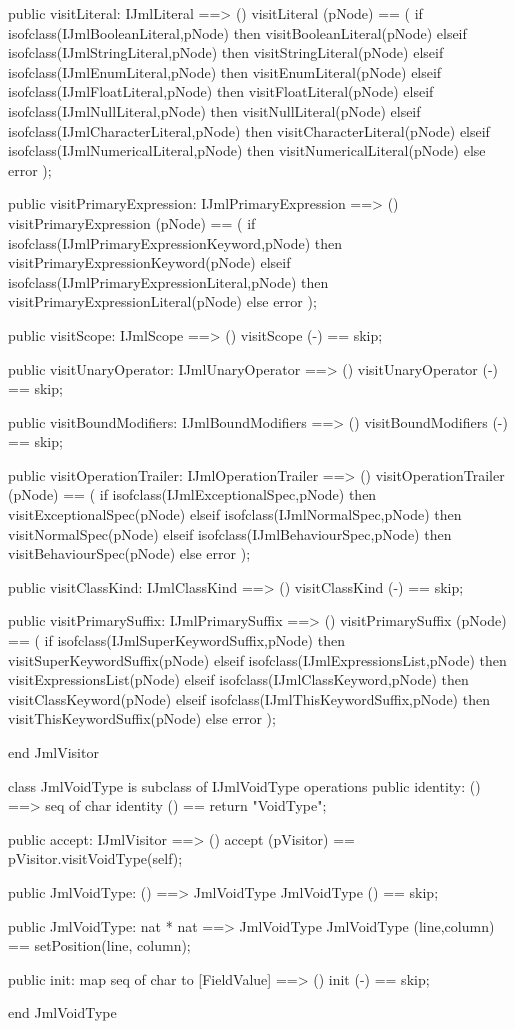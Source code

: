 \begin{vdm_al}
  public visitLiteral: IJmlLiteral ==> ()
  visitLiteral (pNode) ==
    ( if isofclass(IJmlBooleanLiteral,pNode) then visitBooleanLiteral(pNode)
      elseif isofclass(IJmlStringLiteral,pNode) then visitStringLiteral(pNode)
      elseif isofclass(IJmlEnumLiteral,pNode) then visitEnumLiteral(pNode)
      elseif isofclass(IJmlFloatLiteral,pNode) then visitFloatLiteral(pNode)
      elseif isofclass(IJmlNullLiteral,pNode) then visitNullLiteral(pNode)
      elseif isofclass(IJmlCharacterLiteral,pNode) then visitCharacterLiteral(pNode)
      elseif isofclass(IJmlNumericalLiteral,pNode) then visitNumericalLiteral(pNode)
      else error );

  public visitPrimaryExpression: IJmlPrimaryExpression ==> ()
  visitPrimaryExpression (pNode) ==
    ( if isofclass(IJmlPrimaryExpressionKeyword,pNode) then visitPrimaryExpressionKeyword(pNode)
      elseif isofclass(IJmlPrimaryExpressionLiteral,pNode) then visitPrimaryExpressionLiteral(pNode)
      else error );

  public visitScope: IJmlScope ==> ()
  visitScope (-) == skip;

  public visitUnaryOperator: IJmlUnaryOperator ==> ()
  visitUnaryOperator (-) == skip;

  public visitBoundModifiers: IJmlBoundModifiers ==> ()
  visitBoundModifiers (-) == skip;

  public visitOperationTrailer: IJmlOperationTrailer ==> ()
  visitOperationTrailer (pNode) ==
    ( if isofclass(IJmlExceptionalSpec,pNode) then visitExceptionalSpec(pNode)
      elseif isofclass(IJmlNormalSpec,pNode) then visitNormalSpec(pNode)
      elseif isofclass(IJmlBehaviourSpec,pNode) then visitBehaviourSpec(pNode)
      else error );

  public visitClassKind: IJmlClassKind ==> ()
  visitClassKind (-) == skip;

  public visitPrimarySuffix: IJmlPrimarySuffix ==> ()
  visitPrimarySuffix (pNode) ==
    ( if isofclass(IJmlSuperKeywordSuffix,pNode) then visitSuperKeywordSuffix(pNode)
      elseif isofclass(IJmlExpressionsList,pNode) then visitExpressionsList(pNode)
      elseif isofclass(IJmlClassKeyword,pNode) then visitClassKeyword(pNode)
      elseif isofclass(IJmlThisKeywordSuffix,pNode) then visitThisKeywordSuffix(pNode)
      else error );

end JmlVisitor
\end{vdm_al}
\begin{vdm_al}
class JmlVoidType is subclass of IJmlVoidType
operations
  public identity: () ==> seq of char
  identity () == return "VoidType";

  public accept: IJmlVisitor ==> ()
  accept (pVisitor) == pVisitor.visitVoidType(self);

  public JmlVoidType:
    () ==> JmlVoidType
  JmlVoidType () == 
    skip;

  public JmlVoidType:
    nat *
    nat ==> JmlVoidType
  JmlVoidType (line,column) == 
    setPosition(line, column);

  public init: map seq of char to [FieldValue] ==> ()
  init (-) == skip;

end JmlVoidType
\end{vdm_al}

